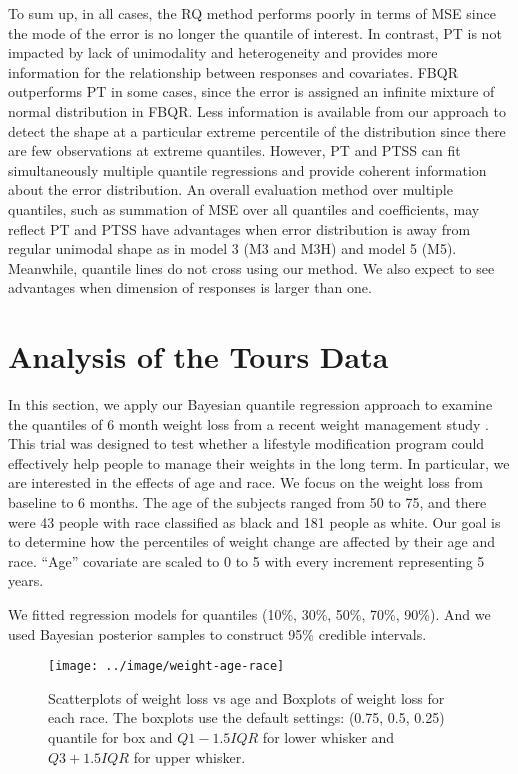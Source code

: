\documentclass[12pt]{article}
\begin{document}
To sum up, in all cases, the RQ method performs poorly in terms of MSE
since the mode of the error is no longer the quantile of interest. In
contrast, PT is not impacted by lack of unimodality and heterogeneity
and provides more information for the relationship between responses
and covariates. FBQR outperforms PT in some cases, since the error is
assigned an infinite mixture of normal distribution in FBQR. Less
information is available from our approach to detect the shape at a
particular extreme percentile of the distribution since there are few
observations at extreme quantiles. However, PT and PTSS can fit
simultaneously multiple quantile regressions and provide coherent
information about the error distribution.  An overall evaluation
method over multiple quantiles, such as summation of MSE over all
quantiles and coefficients, may reflect PT and PTSS have advantages
when error distribution is away from regular unimodal shape as in
model 3 (M3 and M3H) and model 5 (M5).  Meanwhile, quantile lines do
not cross using our method.  We also expect to see advantages when
dimension of responses is larger than one.


\section{Analysis of the Tours Data}
\label{ch2:sec:tours}
In this section, we apply our Bayesian quantile regression approach to
examine the quantiles of 6 month weight loss from a recent weight
management study \citep{perri2008extended}.  This trial was designed
to test whether a lifestyle modification program could effectively
help people to manage their weights in the long term.  In particular,
we are interested in the effects of age and race.  We focus on the
weight loss from baseline to 6 months. The age of the subjects ranged
from 50 to 75, and there were 43 people with race classified as black
and 181 people as white.  Our goal is to determine how the percentiles
of weight change are affected by their age and race.  ``Age''
covariate are scaled to 0 to 5 with every increment representing 5
years.

We fitted regression models for quantiles (10\%, 30\%, 50\%, 70\%,
90\%). And we used Bayesian posterior samples to construct 95\%
credible intervals.

\begin{figure}[htbp]
  \centerline{\texttt{[image: ../image/weight-age-race]}}
  \caption[]{\label{ch2:fig:tours} Scatterplots of weight loss vs age and
    Boxplots of weight loss for each race.  The boxplots use the
    default settings: (0.75, 0.5, 0.25) quantile for box and
    $Q1-1.5IQR$ for lower whisker and $Q3+1.5IQR$ for upper whisker. }
\end{figure}
\end{document}
